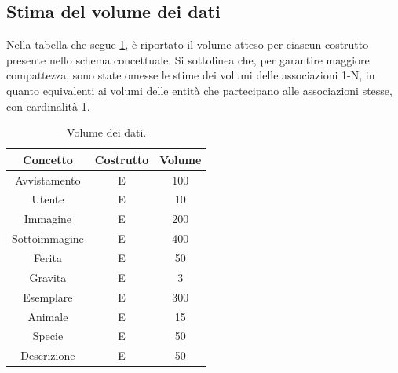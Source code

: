 \documentclass[a4paper,final,12pt]{report}
\begin{document}
\subsection{Stima del volume dei dati}
Nella tabella che segue \ref{table:vdatistim}, è riportato il volume atteso per ciascun costrutto presente nello schema concettuale.
Si sottolinea che, per garantire maggiore compattezza, sono state omesse le stime dei volumi delle associazioni 1-N, in quanto equivalenti ai volumi delle entità che partecipano alle associazioni stesse, con cardinalità 1.

\begin{table}[hbtp]
\centering
\begin{tabular}{|c|c|c|}
\hline
\rowcolor[HTML]{C0C0C0} 
{\color[HTML]{000000} Concetto} & {\color[HTML]{000000} Costrutto} & {\color[HTML]{000000} Volume} \\ \hline
Avvistamento           & E & 100 \\ \hline
Utente                 & E & 10  \\ \hline
Immagine               & E & 200 \\ \hline
Sottoimmagine          & E & 400 \\ \hline
Ferita                 & E & 50  \\ \hline
Gravita                & E & 3   \\ \hline
Esemplare              & E & 300 \\ \hline
Animale                & E & 15   \\ \hline
Specie                 & E & 50   \\ \hline
Descrizione            & E & 50 \\ \hline
\end{tabular}
\caption{Volume dei dati.}
\label{table:vdatistim}
\end{table}
\end{document}
